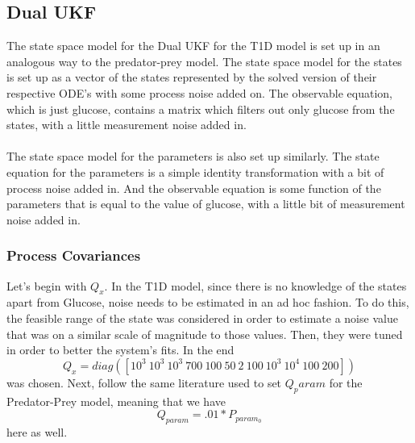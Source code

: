 \documentclass{article}
\begin{document}
\subsection{Dual UKF}
The state space model for the Dual UKF for the T1D model is set up in an analogous way to the predator-prey model. The state space model for the states is set up as a vector of the states represented by the solved version of their respective ODE's  with some process noise added on. The observable equation, which is just glucose, contains a matrix which filters out only glucose from the states, with a little measurement noise added in. \\
\\
The state space model for the parameters is also set up similarly. The state equation for the parameters is a simple identity transformation with a bit of process noise added in. And the observable equation is some function of the parameters that is equal to the value of glucose, with a little bit of measurement noise added in. 

\subsubsection{Process Covariances}\label{section:T1D_Dual_ProcessCovariance}
Let's begin with $Q_x$. In the T1D model, since there is no knowledge of the states apart from Glucose, noise needs to be estimated in an ad hoc fashion. To do this, the feasible range of the state was considered in order to estimate a noise value that was on a similar scale of magnitude to those values. Then, they were tuned in order to better the system's fits. In the end
\begin{equation}
Q_x = diag([10^3 \ 10^3 \ 10^3 \ 700 \ 100 \ 50 \ 2 \ 100 \ 10^3 \ 10^4 \ 100 \ 200])
\end{equation}
was chosen. Next, follow the same literature used to set $Q_param$ for the Predator-Prey model, meaning that we have
\begin{equation}
Q_{param} = .01 * P_{param_0}
\end{equation}
here as well.
\end{document}
